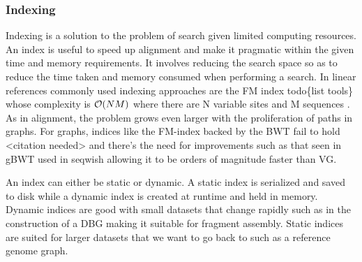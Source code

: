 \documentclass[11pt]{article}
\begin{document}
\subsubsection{Indexing}
\label{sec:org43281ec}
Indexing is a solution to the problem of search given limited computing
resources. An index is useful to speed up alignment and make it pragmatic within
the given time and memory requirements. 
It involves reducing the search space so as to reduce the time taken and memory
consumed when performing a search.
In linear references commonly used indexing approaches are the FM index 
todo\{list tools\} whose complexity is \(\mathcal{O}(NM)\) where there are N variable
sites and M sequences \cite{durbinEfficientHaplotypeMatching2014}.
As in alignment, the problem grows even larger with the proliferation of paths 
in graphs. For graphs, indices like the FM-index backed by the BWT fail to hold
<citation needed> and there’s the need for improvements such as that seen in
gBWT used in seqwish allowing it to be orders of magnitude faster than VG.

An index can either be static or dynamic. A static index is serialized and saved
to disk while a dynamic index is created at runtime and held in memory. Dynamic
indices are good with small datasets that change rapidly such as in the
construction of a DBG making it suitable for fragment assembly. Static indices 
are suited for larger datasets that we want to go back to such as a reference
genome graph.
\end{document}
